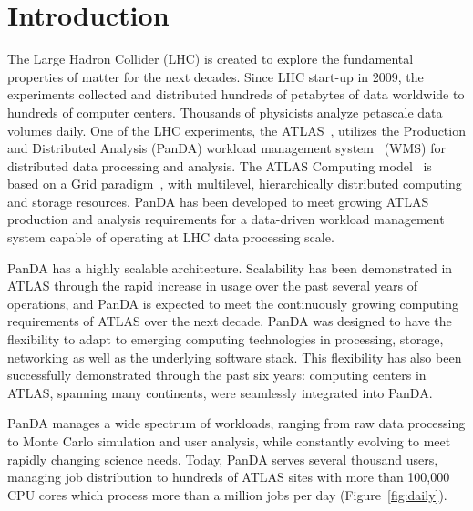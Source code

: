 \section{Introduction}\label{sec:intro}

The Large Hadron Collider (LHC) is created to explore the fundamental properties
of matter for the next decades. Since LHC start-up in 2009, the experiments
collected and distributed hundreds of petabytes of data worldwide to hundreds of
computer centers. Thousands of physicists analyze petascale data volumes daily.
One of the LHC experiments, the ATLAS~\cite{Aad:2008}, utilizes the Production
and Distributed Analysis (PanDA) workload management system~\cite{Maeno2011}
(WMS) for distributed data processing and analysis. The ATLAS Computing
model~\cite{Atlas2005} is based on a Grid paradigm~\cite{Foster:1998}, with
multilevel, hierarchically distributed computing and storage resources. PanDA
has been developed to meet growing ATLAS production and analysis requirements
for a data-driven workload management system capable of operating at LHC data
processing scale.

PanDA has a highly scalable architecture. Scalability has been demonstrated in
ATLAS through the rapid increase in usage over the past several years of
operations, and PanDA is expected to meet the continuously growing computing
requirements of ATLAS over the next decade. PanDA was designed to have the
flexibility to adapt to emerging computing technologies in processing, storage,
networking as well as the underlying software stack. This flexibility has also
been successfully demonstrated through the past six years: computing centers in
ATLAS, spanning many continents, were seamlessly integrated into PanDA\@.

PanDA manages a wide spectrum of workloads, ranging from raw data processing to
Monte Carlo simulation and user analysis, while constantly evolving to meet
rapidly changing science needs. Today, PanDA serves several thousand users,
managing job distribution to hundreds of ATLAS sites with more than 100,000 CPU
cores which process more than a million jobs per day (Figure~\ref{fig:daily}).

